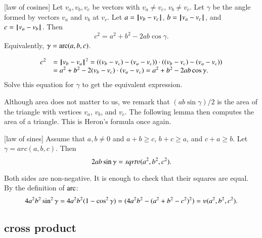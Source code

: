 \begin{lemma}[law of cosines]
Let $v_a,v_b,v_c$ be vectors with $v_a\ne v_c$, $v_b\ne v_c$.
    Let $\gamma$ be the angle formed by vectors $v_a$ and $v_b$ at $v_c$.  Let $a
    = {\hskip0.1em|\hskip-0.15em|\hskip0.1em}v_b  -  v_c{\hskip0.1em|\hskip-0.15em|\hskip0.1em}$, $b = {\hskip0.1em|\hskip-0.15em|\hskip0.1em}v_a  -  v_c{\hskip0.1em|\hskip-0.15em|\hskip0.1em}$, and $c = {\hskip0.1em|\hskip-0.15em|\hskip0.1em}v_a  -  v_b{\hskip0.1em|\hskip-0.15em|\hskip0.1em}$.  Then
        $$c^2 = a^2 + b^2 - 2 a b \cos\gamma.$$
Equivalently, $\gamma = \operatorname{arc}(a,b,c)$.

\end{lemma}
\begin{proved}
    $$\begin{array}{lll}c^2 &= {\hskip0.1em|\hskip-0.15em|\hskip0.1em}v_b  -  v_a{\hskip0.1em|\hskip-0.15em|\hskip0.1em}^2 = ((v_b - v_c) - (v_a - v_c))\cdot ((v_b - v_c) - (v_a -
    v_c)) \\ &= a^2 + b^2 - 2 (v_b - v_c)\cdot (v_a - v_c) = a^2 +b ^2 - 2 a b
    \cos\gamma.
    \end{array}$$
    Solve this equation for $\gamma$ to get the equivalent expression. 
\swallowed\end{proved}

Although area does not matter to us, we remark
that $(a b \sin\gamma)/2$ is the area of the
triangle with vertices $v_a$, $v_b$, and $v_c$.  The following
lemma then
computes the area of a triangle.  This is Heron's formula
once again.

\begin{lemma}[law of sines]
Assume that $a,b\ne 0$ and $a+b\ge c$, $b+c\ge a$, and $c+a\ge b$.
Let $\gamma=arc(a,b,c)$.  Then
        $$2 a b \sin\gamma = \sqrt{\ups(a^2,b^2,c^2)}.$$
\end{lemma}
\begin{proved}
Both sides are non-negative.  It is enough to check
that their squares are equal.  By the definition of $\operatorname{arc}$:
      $$4 a^2 b^2 \sin^2\gamma = 4 a^2 b^2 (1-\cos^2\gamma) = (4 a^2 b^2 - (a^2 + b^2 -
      c^2)^2) = \ups(a^2,b^2,c^2).$$
\swallowed\end{proved}




\subsection{cross product}%

